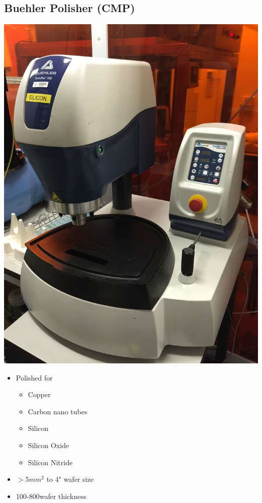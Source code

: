 \subsection{Buehler Polisher (CMP)}\label{cmp_machine}

\begin{minipage}[H]{\MachinePictureWidth}
	\includegraphics[width=\MachinePictureWidth]{pictures_machines/silicon_polisher.png}
\end{minipage}\begin{minipage}[H]{0.5\textwidth}
\begin{itemize}
	\item Polished for
	\begin{itemize}
		\item Copper
		\item Carbon nano tubes
		\item Silicon
		\item Silicon Oxide 
		\item Silicon Nitride
	\end{itemize}
	\item $>5mm^2$ to 4" wafer size
	\item 100-800\um wafer thickness
\end{itemize}
\end{minipage}
